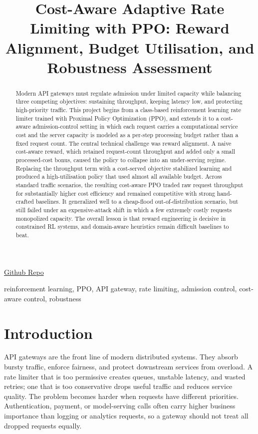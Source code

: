 \documentclass[conference]{IEEEtran}
\title{Cost-Aware Adaptive Rate Limiting with PPO: Reward Alignment, Budget Utilisation, and Robustness Assessment}
\author{
\IEEEauthorblockN{
Harshal Rudra (MT2025706) \and
Manzil Baruah (MT2025715) \and
Sunil Joshi (MT2025726)
}
}
\begin{document}
\maketitle

\begin{center}
\href{https://github.com/TheHarshal30/Reinforcement-Learning-Course-Project}{Github Repo}
\end{center}

\begin{abstract}
Modern API gateways must regulate admission under limited capacity while balancing three competing objectives: sustaining throughput, keeping latency low, and protecting high-priority traffic. This project begins from a class-based reinforcement learning rate limiter trained with Proximal Policy Optimization (PPO), and extends it to a cost-aware admission-control setting in which each request carries a computational service cost and the server capacity is modeled as a per-step processing budget rather than a fixed request count. The central technical challenge was reward alignment. A naive cost-aware reward, which retained request-count throughput and added only a small processed-cost bonus, caused the policy to collapse into an under-serving regime. Replacing the throughput term with a cost-served objective stabilized learning and produced a high-utilisation policy that used almost all available budget. Across standard traffic scenarios, the resulting cost-aware PPO traded raw request throughput for substantially higher cost efficiency and remained competitive with strong hand-crafted baselines. It generalized well to a cheap-flood out-of-distribution scenario, but still failed under an expensive-attack shift in which a few extremely costly requests monopolized capacity. The overall lesson is that reward engineering is decisive in constrained RL systems, and domain-aware heuristics remain difficult baselines to beat.
\end{abstract}

\begin{IEEEkeywords}
reinforcement learning, PPO, API gateway, rate limiting, admission control, cost-aware control, robustness
\end{IEEEkeywords}

\section{Introduction}
API gateways are the front line of modern distributed systems. They absorb bursty traffic, enforce fairness, and protect downstream services from overload. A rate limiter that is too permissive creates queues, unstable latency, and wasted retries; one that is too conservative drops useful traffic and reduces service quality. The problem becomes harder when requests have different priorities. Authentication, payment, or model-serving calls often carry higher business importance than logging or analytics requests, so a gateway should not treat all dropped requests equally.
\end{document}

